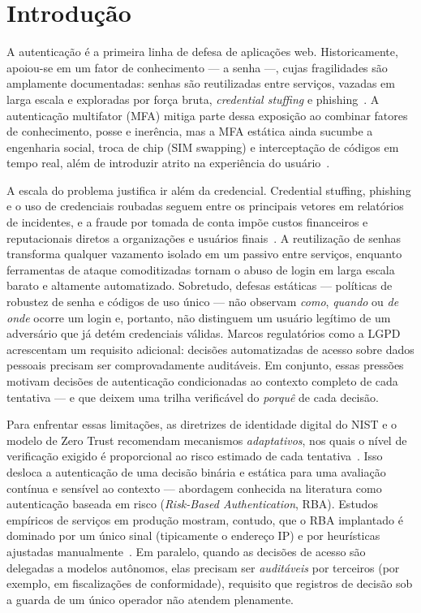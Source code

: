 \documentclass[conference]{IEEEtran}
\begin{document}
\section{Introdução}
A autenticação é a primeira linha de defesa de aplicações web.
Historicamente, apoiou-se em um fator de conhecimento --- a senha ---,
cujas fragilidades são amplamente documentadas: senhas são reutilizadas
entre serviços, vazadas em larga escala e exploradas por força bruta,
\emph{credential stuffing} e phishing~\cite{nist80063b,verizon2024}. A
autenticação multifator (MFA) mitiga parte dessa exposição ao combinar
fatores de conhecimento, posse e inerência, mas a MFA estática ainda
sucumbe a engenharia social, troca de chip (SIM swapping) e interceptação
de códigos em tempo real, além de introduzir atrito na experiência do
usuário~\cite{nist80063b}.

A escala do problema justifica ir além da credencial. Credential
stuffing, phishing e o uso de credenciais roubadas seguem entre os
principais vetores em relatórios de incidentes, e a fraude por tomada de
conta impõe custos financeiros e reputacionais diretos a organizações e
usuários finais~\cite{verizon2024}. A reutilização de senhas transforma
qualquer vazamento isolado em um passivo entre serviços, enquanto
ferramentas de ataque comoditizadas tornam o abuso de login em larga
escala barato e altamente automatizado. Sobretudo, defesas estáticas
--- políticas de robustez de senha e códigos de uso único --- não
observam \emph{como}, \emph{quando} ou \emph{de onde} ocorre um login e,
portanto, não distinguem um usuário legítimo de um adversário que já
detém credenciais válidas. Marcos regulatórios como a
LGPD~\cite{lgpd2018} acrescentam um requisito adicional: decisões
automatizadas de acesso sobre dados pessoais precisam ser comprovadamente
auditáveis. Em conjunto, essas pressões motivam decisões de autenticação
condicionadas ao contexto completo de cada tentativa --- e que deixem
uma trilha verificável do \emph{porquê} de cada decisão.

Para enfrentar essas limitações, as diretrizes de identidade digital do
NIST e o modelo de Zero Trust recomendam mecanismos \emph{adaptativos},
nos quais o nível de verificação exigido é proporcional ao risco
estimado de cada tentativa~\cite{nist80063b,rose2020}. Isso desloca a
autenticação de uma decisão binária e estática para uma avaliação
contínua e sensível ao contexto --- abordagem conhecida na literatura
como autenticação baseada em risco (\emph{Risk-Based Authentication},
RBA). Estudos empíricos de serviços em produção mostram, contudo, que o
RBA implantado é dominado por um único sinal (tipicamente o endereço IP)
e por heurísticas ajustadas manualmente~\cite{wiefling2019,wiefling2023}.
Em paralelo, quando as decisões de acesso são delegadas a modelos
autônomos, elas precisam ser \emph{auditáveis} por terceiros (por
exemplo, em fiscalizações de conformidade), requisito que registros de
decisão sob a guarda de um único operador não atendem plenamente.
\end{document}
